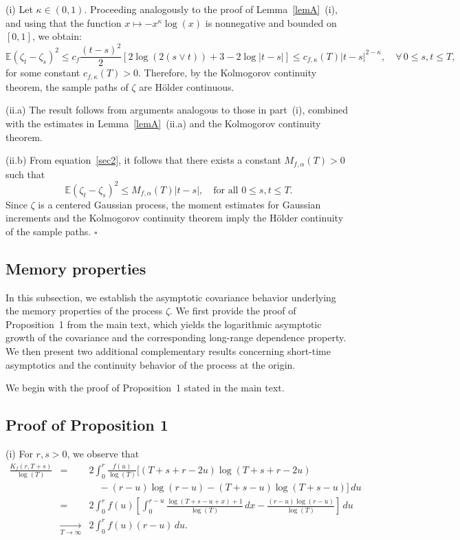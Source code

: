 \documentclass[preprint,12pt,authoryear]{elsarticle}
\def\E{\mathbb{E}}
\begin{document}
 (i) Let \(\kappa \in (0,1)\). Proceeding analogously to the proof of Lemma~\ref{lemA}~(i), and using that the function \(x \mapsto -x^\kappa \log(x)\) is nonnegative and bounded on \([0,1]\), we obtain:
\begin{equation}\label{continuity}
\E(\zeta_{t}-\zeta_{s})^2 \leq c_f \frac{(t-s)^2}{2} \left[2\log(2(s \vee t)) + 3 - 2\log|t - s| \right] \leq c_{f,\kappa}(T) |t - s|^{2 - \kappa}, \quad \forall\, 0 \leq s, t \leq T,
\end{equation}
for some constant \( c_{f,\kappa}(T) > 0 \). Therefore, by the Kolmogorov continuity theorem, the sample paths of \(\zeta\) are Hölder continuous.

(ii.a) The result follows from arguments analogous to those in part~(i), combined with the estimates in Lemma~\ref{lemA}~(ii.a) and the Kolmogorov continuity theorem.

(ii.b) From equation~\eqref{sec2}, it follows that there exists a constant \( M_{f,\alpha}(T) > 0 \) such that
\[
\E(\zeta_t - \zeta_s)^2 \leq M_{f,\alpha}(T) |t - s|, \quad \text{for all } 0 \leq s, t \leq T.
\]
Since \(\zeta\) is a centered Gaussian process, the moment estimates for Gaussian increments and the Kolmogorov continuity theorem imply the Hölder continuity of the sample paths.
\hfill\(\square\)



\subsection{Memory properties}

In this subsection, we establish the asymptotic covariance behavior underlying the memory properties of the process $\zeta$. We first provide the proof of Proposition~1 from the main text, which yields the logarithmic asymptotic growth of the covariance and the corresponding long-range dependence property. We then present two additional complementary results concerning short-time asymptotics and the continuity behavior of the process at the origin.

We begin with the proof of Proposition~1 stated in the main text.



\subsection*{Proof of Proposition 1}

(i) For \( r, s > 0 \), we observe that
\begin{eqnarray*}
\frac{K_f(r, T+s)}{\log(T)} &=& 2\int_0^r \frac{f(u)}{\log(T)} \Big[(T+s+r - 2u)\log(T+s+r - 2u) \\
&& \quad - (r - u)\log(r - u) - (T + s - u)\log(T + s - u)\Big]\,du \\
&=& 2\int_0^r f(u) \left[\int_0^{r - u} \frac{\log(T + s - u + x) + 1}{\log(T)}\,dx - \frac{(r - u)\log(r - u)}{\log(T)}\right]\,du \\
&\xrightarrow[T \to \infty]{}& 2\int_0^r f(u)(r - u)\,du.
\end{eqnarray*}
\end{document}
